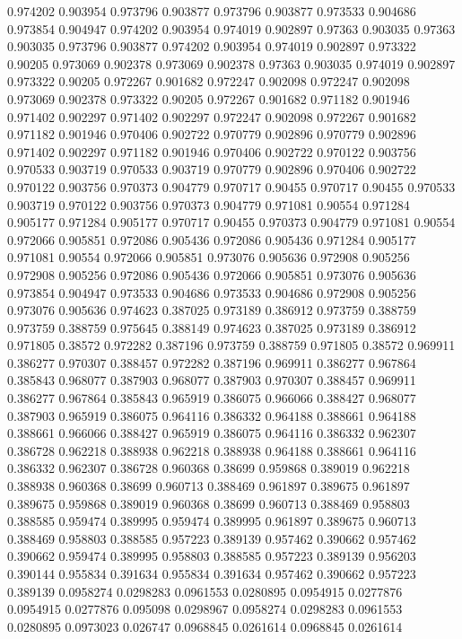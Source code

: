 0.974202 0.903954
0.973796 0.903877
0.973796 0.903877
0.973533 0.904686
0.973854 0.904947
0.974202 0.903954
0.974019 0.902897
0.97363 0.903035
0.97363 0.903035
0.973796 0.903877
0.974202 0.903954
0.974019 0.902897
0.973322 0.90205
0.973069 0.902378
0.973069 0.902378
0.97363 0.903035
0.974019 0.902897
0.973322 0.90205
0.972267 0.901682
0.972247 0.902098
0.972247 0.902098
0.973069 0.902378
0.973322 0.90205
0.972267 0.901682
0.971182 0.901946
0.971402 0.902297
0.971402 0.902297
0.972247 0.902098
0.972267 0.901682
0.971182 0.901946
0.970406 0.902722
0.970779 0.902896
0.970779 0.902896
0.971402 0.902297
0.971182 0.901946
0.970406 0.902722
0.970122 0.903756
0.970533 0.903719
0.970533 0.903719
0.970779 0.902896
0.970406 0.902722
0.970122 0.903756
0.970373 0.904779
0.970717 0.90455
0.970717 0.90455
0.970533 0.903719
0.970122 0.903756
0.970373 0.904779
0.971081 0.90554
0.971284 0.905177
0.971284 0.905177
0.970717 0.90455
0.970373 0.904779
0.971081 0.90554
0.972066 0.905851
0.972086 0.905436
0.972086 0.905436
0.971284 0.905177
0.971081 0.90554
0.972066 0.905851
0.973076 0.905636
0.972908 0.905256
0.972908 0.905256
0.972086 0.905436
0.972066 0.905851
0.973076 0.905636
0.973854 0.904947
0.973533 0.904686
0.973533 0.904686
0.972908 0.905256
0.973076 0.905636
0.974623 0.387025
0.973189 0.386912
0.973759 0.388759
0.973759 0.388759
0.975645 0.388149
0.974623 0.387025
0.973189 0.386912
0.971805 0.38572
0.972282 0.387196
0.973759 0.388759
0.971805 0.38572
0.969911 0.386277
0.970307 0.388457
0.972282 0.387196
0.969911 0.386277
0.967864 0.385843
0.968077 0.387903
0.968077 0.387903
0.970307 0.388457
0.969911 0.386277
0.967864 0.385843
0.965919 0.386075
0.966066 0.388427
0.968077 0.387903
0.965919 0.386075
0.964116 0.386332
0.964188 0.388661
0.964188 0.388661
0.966066 0.388427
0.965919 0.386075
0.964116 0.386332
0.962307 0.386728
0.962218 0.388938
0.962218 0.388938
0.964188 0.388661
0.964116 0.386332
0.962307 0.386728
0.960368 0.38699
0.959868 0.389019
0.962218 0.388938
0.960368 0.38699
0.960713 0.388469
0.961897 0.389675
0.961897 0.389675
0.959868 0.389019
0.960368 0.38699
0.960713 0.388469
0.958803 0.388585
0.959474 0.389995
0.959474 0.389995
0.961897 0.389675
0.960713 0.388469
0.958803 0.388585
0.957223 0.389139
0.957462 0.390662
0.957462 0.390662
0.959474 0.389995
0.958803 0.388585
0.957223 0.389139
0.956203 0.390144
0.955834 0.391634
0.955834 0.391634
0.957462 0.390662
0.957223 0.389139
0.0958274 0.0298283
0.0961553 0.0280895
0.0954915 0.0277876
0.0954915 0.0277876
0.095098 0.0298967
0.0958274 0.0298283
0.0961553 0.0280895
0.0973023 0.026747
0.0968845 0.0261614
0.0968845 0.0261614
